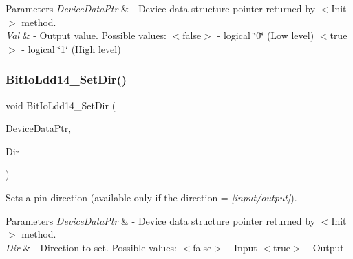 \begin{DoxyParams}{Parameters}
{\em Device\+Data\+Ptr} & -\/ Device data structure pointer returned by $<$\+Init$>$ method. \\
\hline
{\em Val} & -\/ Output value. Possible values\+: $<$false$>$ -\/ logical \char`\"{}0\char`\"{} (Low level) $<$true$>$ -\/ logical \char`\"{}1\char`\"{} (High level) \\
\hline
\end{DoxyParams}
\mbox{\label{group___bit_io_ldd14__module_ga355321bc14f2b7d48f987262e47ec774}} 
\subsubsection{\texorpdfstring{Bit\+Io\+Ldd14\+\_\+\+Set\+Dir()}{BitIoLdd14\_SetDir()}}
{\footnotesize\ttfamily void Bit\+Io\+Ldd14\+\_\+\+Set\+Dir (\begin{DoxyParamCaption}\item[{\hyperlink{group___p_e___types__module_gac5cf1362f1f0e3a2ce71b1bf2276d091}{L\+D\+D\+\_\+\+T\+Device\+Data} $\ast$}]{Device\+Data\+Ptr,  }\item[{\hyperlink{group___p_e___types__module_ga97a80ca1602ebf2303258971a2c938e2}{bool}}]{Dir }\end{DoxyParamCaption})}



Sets a pin direction (available only if the direction = {\itshape \mbox{[}input/output\mbox{]}}). 


\begin{DoxyParams}{Parameters}
{\em Device\+Data\+Ptr} & -\/ Device data structure pointer returned by $<$\+Init$>$ method. \\
\hline
{\em Dir} & -\/ Direction to set. Possible values\+: $<$false$>$ -\/ Input $<$true$>$ -\/ Output \\
\hline
\end{DoxyParams}
\mbox{\label{group___bit_io_ldd14__module_gaa57898006e1c42d880e2a66dbcaecae7}} 
